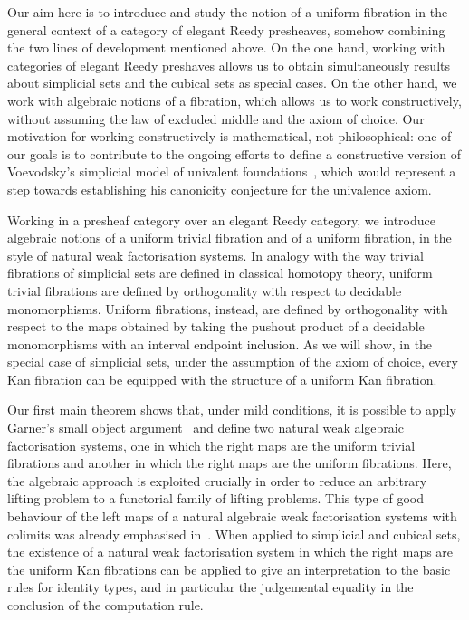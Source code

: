 \documentclass[reqno,10pt,a4paper,oneside]{amsart}
\begin{document}
Our aim here is to introduce and study the notion of a uniform fibration in the general context of
a category of elegant Reedy presheaves, somehow combining the two lines of development mentioned above. 
On the one hand, working  with categories of elegant Reedy preshaves allows us  
to obtain simultaneously results about simplicial sets and the cubical sets as special cases. On the other hand, we work with algebraic notions of a fibration,
which allows us to work constructively, \ie without assuming the law of excluded middle and the axiom of choice. Our motivation for working constructively is mathematical, not philosophical: one of our goals is to contribute to the ongoing efforts to define a constructive version of Voevodsky's simplicial model of univalent foundations~\cite{voevodsky-simplicial-model}, which would represent a step towards establishing his canonicity conjecture for the univalence axiom. 



Working in a presheaf category over an elegant Reedy category, 
we introduce algebraic notions of a uniform trivial fibration and of a uniform fibration,
 in the style of natural weak factorisation systems. 
In analogy with the way trivial fibrations of simplicial sets are defined in classical homotopy theory,
uniform trivial fibrations are defined by orthogonality with respect to decidable monomorphisms. Uniform fibrations, instead, are defined by orthogonality with respect to the maps obtained by taking the pushout product of  a decidable monomorphisms with an interval endpoint inclusion.  As we will show, in the special  case of simplicial sets, under the assumption of the axiom of choice, every Kan fibration can be equipped with the structure of a uniform Kan fibration.

Our first main theorem shows that, under mild conditions, it is possible to apply Garner's small
object argument~\cite{garner:small-object-argument}  and define two natural weak algebraic factorisation systems, one in which 
the right maps are the uniform trivial fibrations and another in which the right maps are the 
uniform fibrations. Here, the algebraic approach is exploited crucially in order to 
reduce an arbitrary lifting problem to a functorial family of lifting problems. This 
type of good behaviour of the left maps of a natural algebraic weak factorisation systems with 
colimits was already emphasised in~\cite{riehl-cat-homotopy}. When applied to 
simplicial and cubical sets, the existence of a natural weak factorisation system 
in which the right maps are the uniform Kan fibrations can be applied to give an interpretation to
the basic rules for identity types, and in particular the judgemental equality in the 
conclusion of the computation rule.
\end{document}
